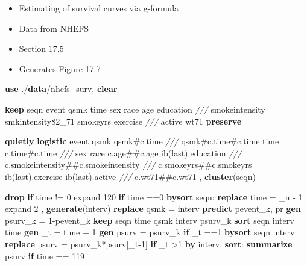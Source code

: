 \documentclass[
  10pt,
]{book}
\newenvironment{Shaded}{\begin{snugshade}}{\end{snugshade}}
\newcommand{\CommentTok}[1]{\textcolor[rgb]{0.56,0.35,0.01}{\textit{#1}}}
\newcommand{\DataTypeTok}[1]{\textcolor[rgb]{0.13,0.29,0.53}{#1}}
\newcommand{\FunctionTok}[1]{\textcolor[rgb]{0.00,0.00,0.00}{#1}}
\newcommand{\KeywordTok}[1]{\textcolor[rgb]{0.13,0.29,0.53}{\textbf{#1}}}
\newcommand{\NormalTok}[1]{#1}
\providecommand{\tightlist}{%
  \setlength{\itemsep}{0pt}\setlength{\parskip}{0pt}}
\begin{document}
\begin{itemize}
\tightlist
\item
  Estimating of survival curves via g-formula
\item
  Data from NHEFS
\item
  Section 17.5
\item
  Generates Figure 17.7
\end{itemize}

\begin{Shaded}
\begin{Highlighting}[]
\KeywordTok{use}\NormalTok{ ./}\KeywordTok{data}\NormalTok{/nhefs\_surv, }\KeywordTok{clear}

\KeywordTok{keep}\NormalTok{ seqn event qsmk time sex race age education }\CommentTok{///}
\NormalTok{  smokeintensity smkintensity82\_71  smokeyrs exercise }\CommentTok{///}
\NormalTok{  active wt71 }
\KeywordTok{preserve}
 
\KeywordTok{quietly} \KeywordTok{logistic}\NormalTok{ event qsmk qsmk\#c.time }\CommentTok{///}
\NormalTok{  qsmk\#c.time\#c.time time c.time\#c.time  }\CommentTok{///}
\NormalTok{    sex race c.age\#\#c.age ib(}\FunctionTok{last}\NormalTok{).education }\CommentTok{///}
\NormalTok{    c.smokeintensity\#\#c.smokeintensity }\CommentTok{///}
\NormalTok{    c.smokeyrs\#\#c.smokeyrs ib(}\FunctionTok{last}\NormalTok{).exercise ib(}\FunctionTok{last}\NormalTok{).active }\CommentTok{///}
\NormalTok{    c.wt71\#\#c.wt71 , }\KeywordTok{cluster}\NormalTok{(seqn) }
            
\KeywordTok{drop} \KeywordTok{if}\NormalTok{ time != 0}
\NormalTok{expand 120 }\KeywordTok{if}\NormalTok{ time ==0 }
\KeywordTok{bysort}\NormalTok{ seqn: }\KeywordTok{replace}\NormalTok{ time = }\DataTypeTok{\_n}\NormalTok{ {-} 1              }
\NormalTok{expand 2 , }\KeywordTok{generate}\NormalTok{(interv) }
\KeywordTok{replace}\NormalTok{ qsmk = interv        }
\KeywordTok{predict}\NormalTok{ pevent\_k, pr}
\KeywordTok{gen}\NormalTok{ psurv\_k = 1{-}pevent\_k}
\KeywordTok{keep}\NormalTok{ seqn  time qsmk interv psurv\_k                 }
\KeywordTok{sort}\NormalTok{ seqn interv time}
\KeywordTok{gen}\NormalTok{ \_t = time + 1}
\KeywordTok{gen}\NormalTok{ psurv = psurv\_k }\KeywordTok{if}\NormalTok{ \_t ==1       }
\KeywordTok{bysort}\NormalTok{ seqn interv: }\KeywordTok{replace}\NormalTok{ psurv = psurv\_k*psurv[\_t{-}1] }\KeywordTok{if}\NormalTok{ \_t \textgreater{}1 }
\KeywordTok{by}\NormalTok{ interv, }\KeywordTok{sort}\NormalTok{: }\KeywordTok{summarize}\NormalTok{ psurv }\KeywordTok{if}\NormalTok{ time == 119}


\end{Highlighting}
\end{Shaded}
\end{document}

